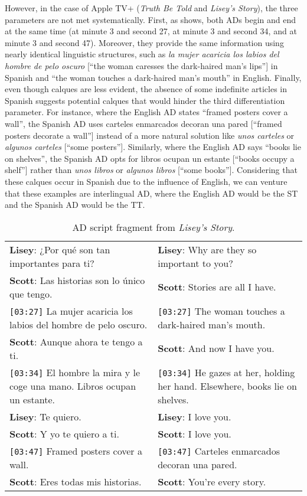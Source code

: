 \documentclass[english]{textolivre}
\begin{document}
However, in the case of Apple TV+ (\textit{Truth Be Told} and \textit{Lisey’s Story}), the three parameters are not met systematically. First, as  shows, both ADs begin and end at the same time (at minute 3 and second 27, at minute 3 and second 34, and at minute 3 and second 47). Moreover, they provide the same information using nearly identical linguistic structures, such as \textit{la mujer acaricia los labios del hombre de pelo oscuro} [“the woman caresses the dark-haired man’s lips”] in Spanish and “the woman touches a dark-haired man’s mouth” in English. Finally, even though calques are less evident, the absence of some indefinite articles in Spanish suggests potential calques that would hinder the third differentiation parameter. For instance, where the English AD states “framed posters cover a wall”, the Spanish AD uses carteles enmarcados decoran una pared [“framed posters decorate a wall”] instead of a more natural solution like  \textit{unos carteles} or \textit{algunos carteles} [“some posters”]. Similarly, where the English AD says “books lie on shelves”, the Spanish AD opts for libros ocupan un estante [“books occupy a shelf”] rather than \textit{unos libros} or \textit{algunos libros} [“some books”]. Considering that these calques occur in Spanish due to the influence of English, we can venture that these examples are interlingual AD, where the English AD would be the ST and the Spanish AD would be the TT.

\begin{table}[htbp]
\centering
\begin{threeparttable}
\caption{AD script fragment from \textit{Lisey’s Story}.}
\label{tbl5}
\begin{tabular}{p{7cm} p{7cm}}
\toprule
\textbf{Lisey}: ¿Por qué son tan importantes para ti? & \textbf{Lisey}: Why are they so important to you?   \\ 
\textbf{Scott}: Las historias son lo único que tengo. & \textbf{Scott}: Stories are all I have.  \\
\texttt{[03:27]} La mujer acaricia los labios del hombre de pelo oscuro. & \texttt{[03:27]} The woman touches a dark-haired man’s mouth. \\
\textbf{Scott}: Aunque ahora te tengo a ti. & \textbf{Scott}: And now I have you. \\
\texttt{[03:34]} El hombre la mira y le coge una mano. Libros ocupan un estante. & \texttt{[03:34]} He gazes at her, holding her hand. Elsewhere, books lie on shelves. \\
\textbf{Lisey}: Te quiero. & \textbf{Lisey}: I love you. \\
\textbf{Scott}: Y yo te quiero a ti. & \textbf{Scott}: I love you. \\
\texttt{[03:47]} Framed posters cover a wall. & \texttt{[03:47]} Carteles enmarcados decoran una pared. \\
\textbf{Scott}: Eres todas mis historias. & \textbf{Scott}: You’re every story. \\
\bottomrule
\end{tabular}
\end{threeparttable}
\end{table}
\end{document}
